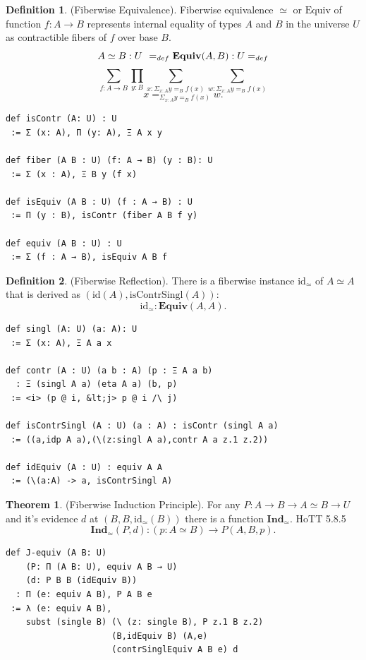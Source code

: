 \documentclass{article}
\theoremstyle{definition}
\newtheorem{definition}{Definition}
\newtheorem{theorem}{Theorem}
\begin{document}
\begin{definition} (Fiberwise Equivalence).
Fiberwise equivalence $\simeq$ or $\mathrm{Equiv}$
of function $f: A \rightarrow B$
represents internal equality of types $A$ and $B$
in the universe $U$ as contractible fibers of $f$
over base $B$.
$$
A\simeq B : U\hspace{.4em}=_{def}\mathbf{Equiv}(A,B) : U =_{def}
$$
$$
\sum_{f: A \rightarrow B}
\prod_{y:B}
\sum_{x: \Sigma_{x:A} y =_B f(x)}
\sum_{w: \Sigma_{x:A} y =_B f(x)}
$$
$$
  x =_{\Sigma_{x:A} y =_B f(x)} w.
$$
\begin{lstlisting}
def isContr (A: U) : U
 := Σ (x: A), Π (y: A), Ξ A x y

def fiber (A B : U) (f: A → B) (y : B): U
 := Σ (x : A), Ξ B y (f x)

def isEquiv (A B : U) (f : A → B) : U
 := Π (y : B), isContr (fiber A B f y)

def equiv (A B : U) : U
 := Σ (f : A → B), isEquiv A B f
\end{lstlisting}
\end{definition}

\begin{definition} (Fiberwise Reflection).
There is a fiberwise instance $\mathrm{id_\simeq}$
of $A\simeq A$ that is derived
as $(\mathrm{id}(A),\mathrm{isContrSingl}(A))$:
$$
  \mathrm{id}_\simeq : \mathbf{Equiv}(A,A).
$$
\begin{lstlisting}
def singl (A: U) (a: A): U
 := Σ (x: A), Ξ A a x

def contr (A : U) (a b : A) (p : Ξ A a b)
  : Ξ (singl A a) (eta A a) (b, p)
 := <i> (p @ i, &lt;j> p @ i /\ j)

def isContrSingl (A : U) (a : A) : isContr (singl A a)
 := ((a,idp A a),(\(z:singl A a),contr A a z.1 z.2))

def idEquiv (A : U) : equiv A A
 := (\(a:A) -> a, isContrSingl A)
\end{lstlisting}
\end{definition}

\begin{theorem} (Fiberwise Induction Principle).
For any $P : A \rightarrow B \rightarrow A \simeq B \rightarrow U$
and it's evidence $d$ at $(B,B,\mathrm{id_\simeq}(B))$
there is a function $\mathbf{Ind}_\simeq$. HoTT 5.8.5
$$
  \mathbf{Ind}_\simeq(P,d) : (p: A\simeq B) \rightarrow P(A,B,p).
$$
\begin{lstlisting}
def J-equiv (A B: U)
    (P: Π (A B: U), equiv A B → U)
    (d: P B B (idEquiv B))
  : Π (e: equiv A B), P A B e
 := λ (e: equiv A B),
    subst (single B) (\ (z: single B), P z.1 B z.2)
                     (B,idEquiv B) (A,e)
                     (contrSinglEquiv A B e) d
\end{lstlisting}
\end{theorem}
\end{document}
